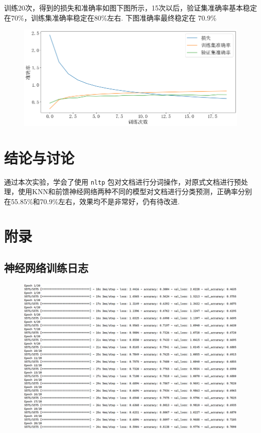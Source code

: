 \documentclass[12pt, a4paper, oneside]{ctexart}
\numberwithin{equation}{section}  %
\begin{document}
训练20次，得到的损失和准确率如图下图所示，15次以后，验证集准确率基本稳定在70\%，训练集准确率稳定在80\%左右.
下图准确率最终稳定在 70.9\%

\begin{figure}[htbp]
    \centering
    \includegraphics[scale=0.5]{note.figure/神经网络训练过程.png}
\end{figure}

\section{结论与讨论}

通过本次实验，学会了使用 \texttt{nltp}
包对文档进行分词操作，对原式文档进行预处理，使用KNN和前馈神经网络两种不同的模型对文档进行分类预测，正确率分别在55.85\%和70.9\%左右，效果均不是非常好，仍有待改进.

\appendix
\section{附录}
\subsection{神经网络训练日志}
\begin{figure}[htbp]
    \centering
    \hspace*{-2.2cm}
    \includegraphics[scale=0.33]{神经网络训练日志.png}
\end{figure}
\end{document}
